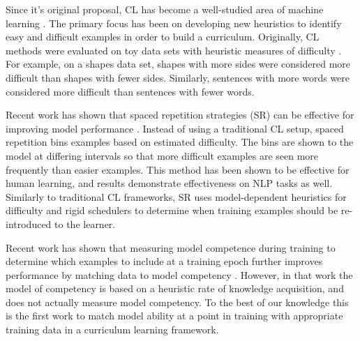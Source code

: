\documentclass[letterpaper]{article} %
\begin{document}
Since it's original proposal, CL has become a well-studied area of machine learning \cite{bengio_curriculum_2009}.
The primary focus has been on developing new heuristics to identify easy and difficult examples in order to build a curriculum. 
Originally, CL methods were evaluated on toy data sets with heuristic measures of difficulty \cite{bengio_curriculum_2009}.
For example, on a shapes data set, shapes with more sides were considered more difficult than shapes with fewer sides.
Similarly, sentences with more words were considered more difficult than sentences with fewer words.

\begin{comment}
Further work on CL has looked at estimating example difficulty by querying the model being trained (CITE EXAMPLES).
Model confidence, example entropy, and other metrics (LIST) have been considered as proxies for difficulty.
However, these all assume that a model uncertainty is equivalent to difficulty.
It is often the case, particularly in deep learning, that a model will overestimate confidence for examples due to the fact that the model is incentivized to push output probabilities to 1 for training examples (CITE ZOUBIN's work here).
These output probabilities are not aligned with a notion of difficulty, and may negatively impact the estimation of such.
What's more, most work relies on a rigid schedule that does not take into account the competency of the model at a point in the training process.
\end{comment} 

Recent work has shown that spaced repetition strategies (SR) can be effective for improving model performance \cite{amiri_repeat_2017,amiri_neural_2019}.
Instead of using a traditional CL setup, spaced repetition bins examples based on estimated difficulty.
The bins are shown to the model at differing intervals so that more difficult examples are seen more frequently than easier examples.
This method has been shown to be effective for human learning, and results demonstrate effectiveness on NLP tasks as well.
Similarly to traditional CL frameworks, SR uses model-dependent heuristics for difficulty and rigid schedulers to determine when training examples should be re-introduced to the learner.

Recent work has shown that measuring model competence during training to determine which examples to include at a training epoch further improves performance by matching data to model competency \cite{platanios_competence-based_2019}.
However, in that work the model of competency is based on a heuristic rate of knowledge acquisition, and does not actually measure model competency.
To the best of our knowledge this is the first work to match model ability at a point in training with appropriate training data in a curriculum learning framework.
\end{document}
